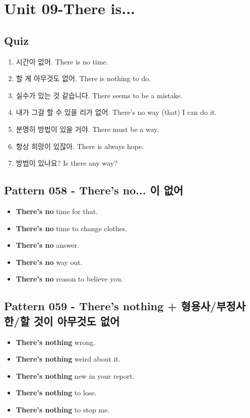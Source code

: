 \documentclass[11pt]{oblivoir}
\begin{document}
\section{Unit 09-There is...}
\subsection{Quiz}
\begin{enumerate}
  \color{black} \item 시간이 없어. 
    \color{light-gray} There is no time.
  \color{black} \item 할 게 아무것도 없어. 
    \color{light-gray} There is nothing to do.
  \color{red} \item 실수가 있는 것 같습니다. 
    \color{light-gray} There seems to be a mistake.
  \color{red} \item 내가 그걸 할 수 있을 리가 없어.
    \color{light-gray} There's no way (that) I can do it.
  \color{red} \item 분명히 방법이 있을 거야. 
    \color{light-gray} There must be a way.
  \color{red} \item 항상 희망이 있잖아.
    \color{light-gray} There is always hope.
   \color{red} \item 방법이 있나요?
    \color{light-gray} Is there any way?
\end{enumerate}

\subsection{Pattern 058 - There's no... \texttildelow 이 없어}
\begin{itemize}
  \item \textbf{There's no} time for that.
  \item \textbf{There's no} time to change clothes.
  \item \textbf{There's no} answer.
  \item \textbf{There's no} way out.
  \item \textbf{There's no} reason to believe you.
\end{itemize}

\subsection{Pattern 059 - There's nothing + 형용사/부정사 \texttildelow 한/\texttildelow 할 것이 아무것도 없어}
\begin{itemize}
  \item \textbf{There's nothing} wrong.
  \item \textbf{There's nothing} weird about it.
  \item \textbf{There's nothing} new in your report.
  \item \textbf{There's nothing} to lose.
  \item \textbf{There's nothing} to stop me.
\end{itemize}
\end{document}
